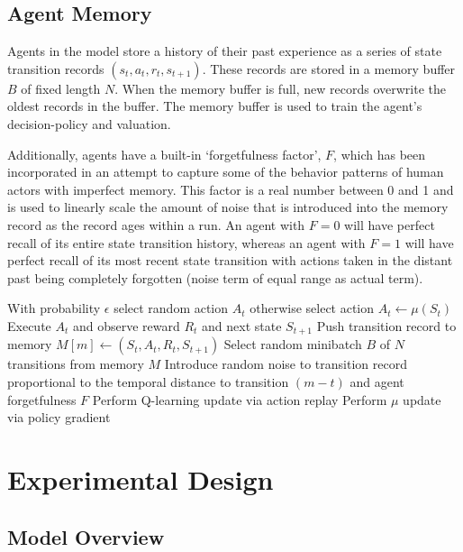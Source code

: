 \subsection{Agent Memory}
\label{subsec:farm_methods_memory}

Agents in the model store a history of their past experience as
a series of state transition records $(s_t,a_t,r_t,s_{t+1})$.
These records are stored in a memory buffer $B$ of fixed length $N$.
When the memory buffer is full, new records overwrite the oldest records in
the buffer.
The memory buffer is used to train the agent's decision-policy and valuation.

Additionally,
agents have a built-in `forgetfulness factor', $F$,
which has been incorporated in an attempt to capture some of the behavior
patterns of human actors with imperfect memory.
This factor is a real number between 0 and 1 and is used to linearly scale the
amount of noise that is introduced into the memory record as the record
ages within a run.
An agent with $F=0$ will have perfect recall of its entire state transition
history, whereas an agent with $F=1$ will have perfect recall of its most
recent state transition with actions taken in the distant past being
completely forgotten (noise term of equal range as actual term).

\begin{algorithmic}
\State With probability $\epsilon$ select random action $A_t$
\State otherwise select action $A_t \gets \mu(S_t)$
\State Execute $A_t$ and observe reward $R_t$ and next state $S_{t+1}$
\State Push transition record to memory $M[m]\gets (S_t, A_t, R_t, S_{t+1})$
\State Select random minibatch $B$ of $N$ transitions from memory $M$
\State Introduce random noise to transition record proportional to the
\State temporal distance to transition $(m-t)$ and agent forgetfulness $F$
\EndIf
\State Perform Q-learning update via action replay
\State Perform $\mu$ update via policy gradient
\EndFor
\end{algorithmic}


\section{Experimental Design}
\label{sec:farm_ex}

\subsection{Model Overview}

